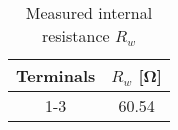 \begin{table}[hptb]
	\centering
	\caption{Measured internal resistance $R_w$}
	\label{tab:tab1}
	\begin{tabular}{|c|c|}
		\hline
		Terminals & $R_w$ [\unit{\ohm}] \\
		\hline
		1-3 & 60.54\\
		\hline
	\end{tabular}
\end{table}